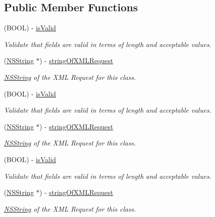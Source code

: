 \subsection*{Public Member Functions}
\begin{DoxyCompactItemize}
\item 
(BOOL) -\/ \hyperlink{interface_order_type_aed0335271275111bb2643b889bca0d5e}{isValid}
\begin{DoxyCompactList}\small\item\em Validate that fields are valid in terms of length and acceptable values. \item\end{DoxyCompactList}\item 
(\hyperlink{class_n_s_string}{NSString} $\ast$) -\/ \hyperlink{interface_order_type_a699d1eb0cc2c4aca5e79d9873931c079}{stringOfXMLRequest}
\begin{DoxyCompactList}\small\item\em \hyperlink{class_n_s_string}{NSString} of the XML Request for this class. \item\end{DoxyCompactList}\item 
(BOOL) -\/ \hyperlink{interface_order_type_aed0335271275111bb2643b889bca0d5e}{isValid}
\begin{DoxyCompactList}\small\item\em Validate that fields are valid in terms of length and acceptable values. \item\end{DoxyCompactList}\item 
(\hyperlink{class_n_s_string}{NSString} $\ast$) -\/ \hyperlink{interface_order_type_a699d1eb0cc2c4aca5e79d9873931c079}{stringOfXMLRequest}
\begin{DoxyCompactList}\small\item\em \hyperlink{class_n_s_string}{NSString} of the XML Request for this class. \item\end{DoxyCompactList}\item 
(BOOL) -\/ \hyperlink{interface_order_type_aed0335271275111bb2643b889bca0d5e}{isValid}
\begin{DoxyCompactList}\small\item\em Validate that fields are valid in terms of length and acceptable values. \item\end{DoxyCompactList}\item 
(\hyperlink{class_n_s_string}{NSString} $\ast$) -\/ \hyperlink{interface_order_type_a699d1eb0cc2c4aca5e79d9873931c079}{stringOfXMLRequest}
\begin{DoxyCompactList}\small\item\em \hyperlink{class_n_s_string}{NSString} of the XML Request for this class. \item\end{DoxyCompactList}\end{DoxyCompactItemize}
